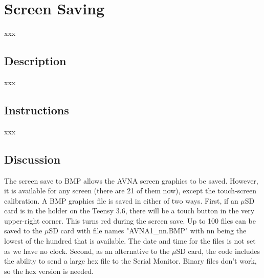 \section{Screen Saving}
xxx
\subsection{Description}
xxx
\subsection{Instructions}
xxx
\subsection{Discussion}
The screen save to BMP allows the AVNA screen graphics to be saved.  However, it is available for any screen (there are 21 of them now), except the touch-screen calibration.  A BMP graphics file is saved in either of two ways.  First, if an $\mu$SD card is in the holder on the Teensy 3.6, there will be a touch button in the very upper-right corner.  This turns red during the screen save.  Up to 100 files can be saved to the $\mu$SD card with file names "AVNA1\_nn.BMP" with nn being the lowest of the hundred that is available.  The date and time for the files is not set as we have no clock.  Second, as an alternative to the $\mu$SD card, the code includes the ability to send a large hex file to the Serial Monitor.  Binary files don't work, so the hex version is needed.
